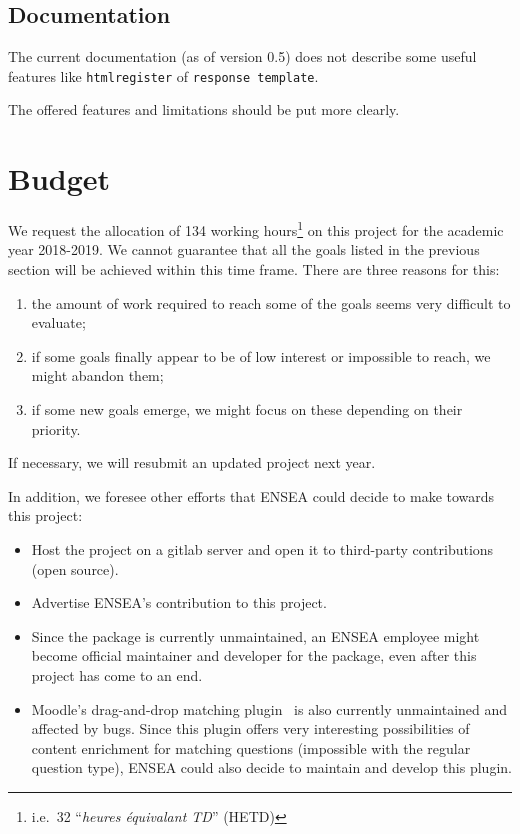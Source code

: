 \documentclass[twocolumn,a4paper,9pt]{article}
\begin{document}
\subsection{Documentation}

The current documentation (as of version 0.5) does not describe some useful 
features like \texttt{htmlregister} of \texttt{response template}.

The offered features and limitations should be put more clearly.

\section{Budget}

We request the allocation of 134 working hours\footnote{i.e.~32 ``\emph{heures 
équivalant TD}'' (HETD)} on this project for the academic year 2018-2019. 
We cannot guarantee that all the goals listed in the previous section will be 
achieved within this time frame. There are three 
reasons for this:
\begin{enumerate}
	\item the amount of work required to reach some of the goals seems very 
	difficult to evaluate;
	\item if some goals finally appear to be of low interest or impossible to 
	reach, we might abandon them;
	\item if some new goals emerge, we might focus on these depending on their 
	priority.
\end{enumerate}
If necessary, we will resubmit an updated project next year.

In addition, we foresee other efforts that ENSEA could decide to make towards 
this project:
\begin{itemize}
\item Host the project on a gitlab server and open it to third-party 
contributions (open source).
\item Advertise ENSEA's contribution to this project.
\item Since the package is currently unmaintained, an ENSEA employee might 
become official maintainer and developer for the package, even after this 
project has come to an end.
\item Moodle's drag-and-drop matching plugin~\cite{ddmatch} is also currently 
unmaintained and affected by bugs. Since this plugin offers very interesting 
possibilities of content enrichment for matching questions (impossible with the 
regular question type), ENSEA could also decide to maintain and develop this 
plugin.
\end{itemize}
\end{document}
